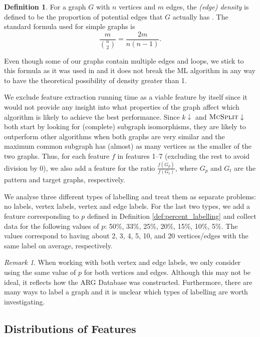 \documentclass{l4proj}
\theoremstyle{definition}
\newtheorem{definition}{Definition}[section]
\theoremstyle{remark}
\newtheorem{remark}{Remark}[section]
\begin{document}
\begin{definition}
For a graph $G$ with $n$ vertices and $m$ edges, the \emph{(edge) density} is
defined to be the proportion of potential edges that $G$ actually has
\cite{DBLP:books/daglib/0030488}. The standard formula used for simple graphs is
\[ \frac{m}{\binom{n}{2}} = \frac{2m}{n(n-1)}. \]
\end{definition}
Even though some of our graphs contain multiple edges and loops, we stick to
this formula as it was used in \cite{DBLP:conf/lion/KotthoffMS16} and it does
not break the ML algorithm in any way to have the theoretical possibility of
density greater than 1.

We exclude feature extraction running time as a viable feature by itself since
it would not provide any insight into what properties of the graph affect which
algorithm is likely to achieve the best performance. Since $k\downarrow$ and
$\textsc{McSplit}\downarrow$ both start by looking for (complete) subgraph
isomorphisms, they are likely to outperform other algorithms when both graphs
are very similar and the maximum common subgraph has (almost) as many vertices
as the smaller of the two graphs. Thus, for each feature $f$ in features 1--7
(excluding the rest to avoid division by 0), we also add a feature for the ratio
$\frac{f(G_p)}{f(G_t)}$, where $G_p$ and $G_t$ are the pattern and target
graphs, respectively.

We analyse three different types of labelling and treat them as separate
problems: no labels, vertex labels, vertex and edge labels. For the last two
types, we add a feature corresponding to $p$ defined in Definition
\ref{def:percent_labelling} and collect data for the following values of $p$:
50\%, 33\%, 25\%, 20\%, 15\%, 10\%, 5\%. The values correspond to having about
2, 3, 4, 5, 10, and 20 vertices/edges with the same label on average,
respectively.

\begin{remark} %
  When working with both vertex and edge labels, we only consider using the same
  value of $p$ for both vertices and edges. Although this may not be ideal, it
  reflects how the ARG Database was constructed. Furthermore, there are many
  ways to label a graph and it is unclear which types of labelling are worth
  investigating.
\end{remark}

\subsection{Distributions of Features}
\end{document}
